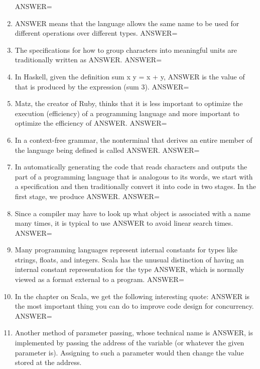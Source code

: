 \documentclass{exam}
\begin{document}
\begin{enumerate}
ANSWER=
\item ANSWER means that the language allows the same name to be used for different operations over different types.\newline
ANSWER=
\item The specifications for how to group characters into meaningful units are traditionally written as ANSWER.\newline
ANSWER=
\item In Haskell, given the definition sum x y = x + y, ANSWER is the value of that is produced by the expression (sum 3).\newline
ANSWER=
\item Matz, the creator of Ruby, thinks that it is less important to optimize the execution (efficiency) of a programming language and more important to optimize the efficiency of ANSWER.\newline
ANSWER=
\item In a context-free grammar, the nonterminal that derives an entire member of the language being defined is called ANSWER.\newline
ANSWER=
\item In automatically generating the code that reads characters and outputs the part of a programming language that is analogous to its words, we start with a specification and then traditionally convert it into code in two stages.  In the first stage, we produce ANSWER.\newline
ANSWER=
\item Since a compiler may have to look up what object is associated with a name many times, it is typical to use ANSWER to avoid linear search times.\newline
ANSWER=
\item Many programming languages represent internal constants for types like strings, floats, and integers.  Scala has the unusual distinction of having an internal constant representation for the type ANSWER, which is normally viewed as a format external to a program.\newline
ANSWER=
\item In the chapter on Scala, we get the following interesting quote: ANSWER is the most important thing you can do to improve code design for concurrency.\newline
ANSWER=
\item Another method of parameter passing, whose technical name is ANSWER, is implemented by passing the address of the variable (or whatever the given parameter is).  Assigning to such a parameter would then change the value stored at the address.\newline

\end{enumerate}
\end{document}
